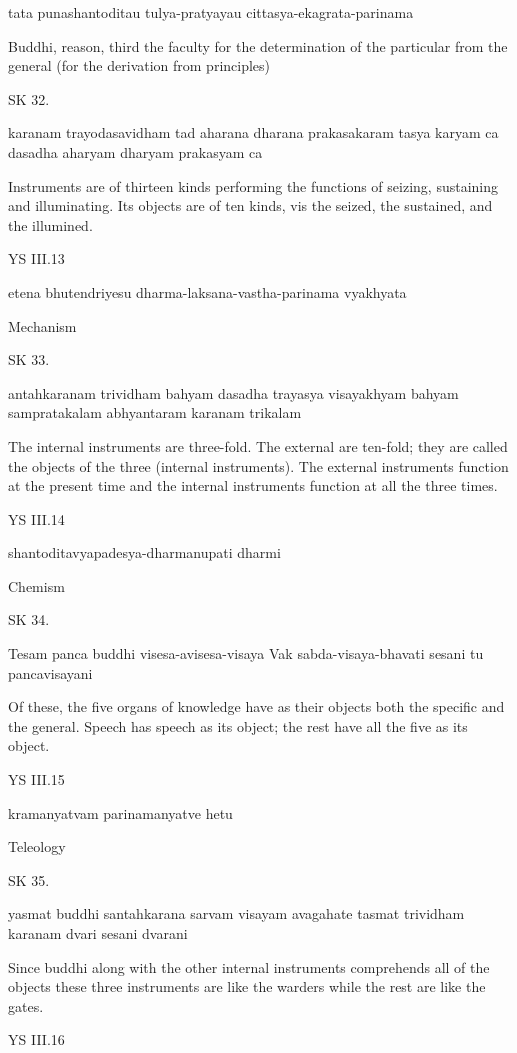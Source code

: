     tata punashantoditau tulya-pratyayau cittasya-ekagrata-parinama

    Buddhi, reason, third the faculty for the determination of
    the particular from the general (for the derivation from principles)

SK 32.

karanam trayodasavidham tad aharana dharana prakasakaram
tasya karyam ca dasadha aharyam dharyam prakasyam ca

Instruments are of thirteen kinds performing the functions of
seizing, sustaining and illuminating.
Its objects are of ten kinds, vis
the seized, the sustained, and the illumined.

YS III.13

    etena bhutendriyesu dharma-laksana-vastha-parinama vyakhyata

    Mechanism

SK 33.

antahkaranam trividham bahyam dasadha trayasya visayakhyam
bahyam sampratakalam abhyantaram karanam trikalam

The internal instruments are three-fold.
The external are ten-fold;
they are called the objects of the three (internal instruments).
The external instruments function at the present time
and the internal instruments function at all the three times.

YS III.14

    shantoditavyapadesya-dharmanupati dharmi

    Chemism

SK 34.

Tesam panca buddhi visesa-avisesa-visaya
Vak sabda-visaya-bhavati sesani tu pancavisayani

Of these, the five organs of knowledge have as their objects
both the specific and the general.
Speech has speech as its object;
the rest have all the five as its object.

YS III.15

    kramanyatvam parinamanyatve hetu

    Teleology

SK 35.

yasmat buddhi santahkarana sarvam visayam avagahate
tasmat trividham karanam dvari sesani dvarani

Since buddhi along with the other internal instruments
comprehends all of the objects these three instruments are
like the warders while the rest are like the gates.

YS III.16

